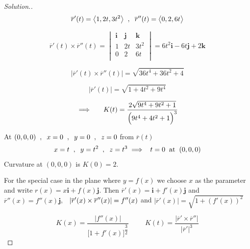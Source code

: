 \documentclass[11pt,a4paper]{article}
\theoremstyle{definition}
\newenvironment{solution}
  {\renewcommand{\qedsymbol}{}\begin{proof}[\textit{Solution}.]}
  {\end{proof}}
\begin{document}
\begin{solution}
$$\overline{r}'(t) =\big\langle 1, 2t, 3t^2\big\rangle\hspace{0.2cm} , \hspace{0.2cm} \overline{r}''(t) = \big\langle 0, 2, 6t\big\rangle$$

$$\overline{r}'(t) \times \overline{r}''(t) = \begin{vmatrix}
\textbf{i} & \textbf{j} & \textbf{k}\\
1 & 2t & 3t^2\\
0 & 2 & 6t\\
\end{vmatrix}= 6t^2\textbf{i} - 6t\textbf{j} + 2\textbf{k}$$

$$\left|\overline{r}'(t) \times \overline{r}''(t)\right|=\sqrt{36t^4 + 36t^2 + 4}$$

$$\left|\overline{r}'(t)\right|= \sqrt{1 + 4t^2 + 9t^4}$$

$$\implies\hspace{0.5cm} K(t) = \frac{2\sqrt{9t^4 + 9t^2 + 1}}{\Big(9t^4 + 4t^2 + 1\Big)^3}$$

At $(0,0,0)\hspace{0.2cm},\hspace{0.2cm} x = 0 \hspace{0.2cm},\hspace{0.2cm} y = 0 \hspace{0.2cm},\hspace{0.2cm} z = 0$ from $\overline{r}(t)$ $$x =t \hspace{0.2cm},\hspace{0.2cm} y = t^2 \hspace{0.2cm},\hspace{0.2cm} z = t^3\implies \hspace{0.2cm} t = 0\hspace{0.2cm}\text{at}\hspace{0.2cm} (0,0,0)$$
Curvature at $(0,0,0)$ is $K(0) = 2$.


For the special case in the plane where $y = f(x)$ we choose $x$ as the parameter and write $r(x) = x\textbf{i} + f(x)\textbf{j}$. Then $\overline{r}'(x) = \textbf{i} + f'(x)\textbf{j}$ and $\overline{r}''(x) = f''(x)\textbf{j}$, $\hspace{0.2cm} \left|\overline{r}'(x)\times \overline{r}''(x)\right|= f''(x)$
and $\left|\overline{r}'(x)\right| = \sqrt{1 + (f'(x))^2}$

$$K(x) = \frac{\left|f''(x)\right|
}{\Big[ 1 + f'(x)\Big]^{\dfrac{3}{2}}}\hspace{1cm}
K(t) = \frac{
\left|\overline{r}'\times \overline{r}''\right|
}{\left|\overline{r}'\right|^3
}$$
\end{solution}
\end{document}
